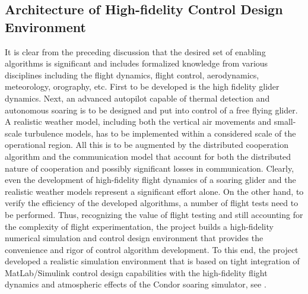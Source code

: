 \documentclass[letterpaper, 10 pt, conference]{ieeeconf}  %
\newcommand{\squeezeup}{\vspace{-1.0mm}}
\begin{document}
\subsection{Architecture of High-fidelity Control Design Environment}
\squeezeup
It is clear from the preceding discussion that the desired set of enabling algorithms is significant and includes formalized knowledge from various disciplines including the flight dynamics, flight control, aerodynamics, meteorology, orography, etc. First to be developed is the high fidelity glider dynamics. Next, an advanced autopilot capable of thermal detection and autonomous soaring is to be designed and put into control of a free flying glider. A realistic weather model, including both the vertical air movements and small-scale turbulence models, has to be implemented within a considered scale of the operational region. All this is to be augmented by the distributed cooperation algorithm and the communication model that account for both the distributed nature of cooperation and possibly significant losses in communication. Clearly, even the development of high-fidelity flight dynamics of a soaring glider and the realistic weather models represent a significant effort alone. On the other hand, to verify the efficiency of the developed algorithms, a number of flight tests need to be performed. Thus,  recognizing the value of flight testing and still accounting for the complexity of flight experimentation, the project builds a high-fidelity numerical simulation and control design environment that provides the convenience and rigor of control algorithm development. To this end, the project developed a realistic simulation environment that is based on tight integration of MatLab/Simulink \cite{MATLAB:2013} control design capabilities with the high-fidelity flight dynamics and atmospheric effects of the Condor soaring simulator, see \cite{Condor:2013:Online}.
\end{document}
